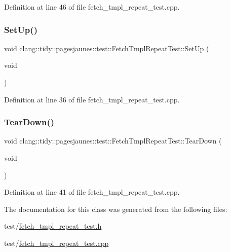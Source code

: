 Definition at line 46 of file fetch\+\_\+tmpl\+\_\+repeat\+\_\+test.\+cpp.

\mbox{\label{classclang_1_1tidy_1_1pagesjaunes_1_1test_1_1_fetch_tmpl_repeat_test_a3871f1883bcc4420f42f4bfb0043add8}} 
\subsubsection{\texorpdfstring{Set\+Up()}{SetUp()}}
{\footnotesize\ttfamily void clang\+::tidy\+::pagesjaunes\+::test\+::\+Fetch\+Tmpl\+Repeat\+Test\+::\+Set\+Up (\begin{DoxyParamCaption}\item[{void}]{ }\end{DoxyParamCaption})\hspace{0.3cm}{\ttfamily [virtual]}}



Definition at line 36 of file fetch\+\_\+tmpl\+\_\+repeat\+\_\+test.\+cpp.

\mbox{\label{classclang_1_1tidy_1_1pagesjaunes_1_1test_1_1_fetch_tmpl_repeat_test_a2df8e1e13d43d0bad1347f1da7dc53d4}} 
\subsubsection{\texorpdfstring{Tear\+Down()}{TearDown()}}
{\footnotesize\ttfamily void clang\+::tidy\+::pagesjaunes\+::test\+::\+Fetch\+Tmpl\+Repeat\+Test\+::\+Tear\+Down (\begin{DoxyParamCaption}\item[{void}]{ }\end{DoxyParamCaption})\hspace{0.3cm}{\ttfamily [virtual]}}



Definition at line 41 of file fetch\+\_\+tmpl\+\_\+repeat\+\_\+test.\+cpp.



The documentation for this class was generated from the following files\+:\begin{DoxyCompactItemize}
\item 
test/\hyperlink{fetch__tmpl__repeat__test_8h}{fetch\+\_\+tmpl\+\_\+repeat\+\_\+test.\+h}\item 
test/\hyperlink{fetch__tmpl__repeat__test_8cpp}{fetch\+\_\+tmpl\+\_\+repeat\+\_\+test.\+cpp}\end{DoxyCompactItemize}

